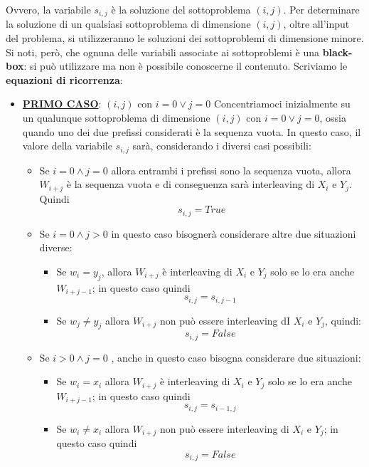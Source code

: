 \documentclass[12pt]{article}
\begin{document}
Ovvero, la variabile $s_{i,j}$ è la soluzione del sottoproblema $(i,j)$. Per determinare la soluzione di un qualsiasi sottoproblema di dimensione $(i,j)$, oltre all'input del problema, si utilizzeranno le soluzioni dei sottoproblemi di dimensione minore.
Si noti, però, che ognuna delle variabili associate ai sottoproblemi è una \textbf{black-box}: si può utilizzare ma non è possibile conoscerne il contenuto.
Scriviamo le \textbf{equazioni di ricorrenza}:
\begin{itemize}
    \item \textbf{\underline{PRIMO CASO}}: $(i,j)$ con $i = 0 \vee j = 0$ \newline
    Concentriamoci inizialmente su un qualunque sottoproblema di dimensione $(i,j)$ con $i = 0 \vee j = 0$, ossia quando uno dei due prefissi considerati è la sequenza vuota. In questo caso, il valore della variabile $s_{i,j}$ sarà, considerando i diversi casi possibili:
    \begin{itemize}
        \item Se $i = 0 \land j = 0$ allora entrambi i prefissi sono la sequenza vuota, allora $W_{i+j}$ è la sequenza vuota e di conseguenza sarà interleaving di $X_i$ e $Y_j$. Quindi
        $$s_{i,j} = True$$
        \item Se $i = 0 \land j > 0$ in questo caso bisognerà considerare altre due situazioni diverse:
        \begin{itemize}
            \item Se $w_i = y_j$, allora $W_{i+j}$ è interleaving di $X_i$ e $Y_j$ solo se lo era anche $W_{i+j-1}$; in questo caso quindi
            $$s_{i, j} = s_{i, j-1}$$
            \item Se $w_j \neq y_j$ allora $W_{i+j}$ non può essere interleaving dI $X_i$ e $Y_j$, quindi:
            $$s_{i,j} = False$$
        \end{itemize}
        \item Se $i > 0 \land j = 0$ , anche in questo caso bisogna considerare due situazioni:
        \begin{itemize}
            \item Se $w_i = x_i$ allora $W_{i+j}$ è interleaving di $X_i$ e $Y_j$ solo se lo era anche $W_{i+j-1}$; in questo caso quindi
            $$s_{i,j} = s_{i-1, j}$$
            \item Se $w_i \neq x_i$ allora $W_{i+j}$ non può essere interleaving di $X_i$ e $Y_j$; in questo caso quindi
            $$s_{i,j} = False$$
        \end{itemize}
    \end{itemize}

\end{itemize}
\end{document}
